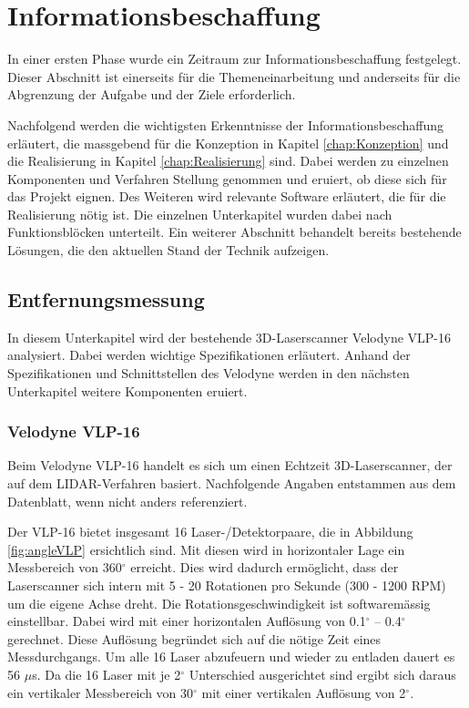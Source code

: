 \chapter{Informationsbeschaffung}
\label{Informationsbeschaffung}
 In einer ersten Phase wurde ein Zeitraum zur Informationsbeschaffung festgelegt. Dieser Abschnitt ist einerseits für die Themeneinarbeitung und anderseits für die Abgrenzung der Aufgabe und der Ziele erforderlich.

Nachfolgend werden die wichtigsten Erkenntnisse der Informationsbeschaffung erläutert, die massgebend für die Konzeption in Kapitel \ref{chap:Konzeption} und die Realisierung in Kapitel \ref{chap:Realisierung} sind. Dabei werden zu einzelnen Komponenten und Verfahren Stellung genommen und eruiert, ob diese sich für das Projekt eignen. Des Weiteren wird relevante Software erläutert, die für die Realisierung nötig ist. Die einzelnen Unterkapitel wurden dabei nach Funktionsblöcken unterteilt. Ein weiterer Abschnitt behandelt bereits bestehende Lösungen, die den aktuellen Stand der Technik aufzeigen. 

\section{Entfernungsmessung}
\label{sec:Entfernungsmessung}
In diesem Unterkapitel wird der bestehende 3D-Laserscanner Velodyne VLP-16 analysiert. Dabei werden wichtige Spezifikationen erläutert. Anhand der Spezifikationen und Schnittstellen des Velodyne werden in den nächsten Unterkapitel weitere Komponenten eruiert.   

\subsection{Velodyne VLP-16}
\label{subsec:Velodyne}
Beim Velodyne VLP-16 handelt es sich um einen Echtzeit 3D-Laserscanner, der auf dem \ac{LIDAR}-Verfahren basiert. Nachfolgende Angaben entstammen aus dem Datenblatt, wenn nicht anders referenziert. \protect\cite{velodyne}

Der VLP-16 bietet insgesamt 16 Laser-/Detektorpaare, die in Abbildung \ref{fig:angleVLP} ersichtlich sind. Mit diesen wird in horizontaler Lage ein Messbereich von 360$^\circ$  erreicht. Dies wird dadurch ermöglicht, dass der Laserscanner sich intern mit 5 - 20 Rotationen pro Sekunde (300 - 1200 RPM) um die eigene Achse dreht. Die Rotationsgeschwindigkeit ist softwaremässig einstellbar. Dabei wird mit einer horizontalen Auflösung von 0.1$^\circ$ – 0.4$^\circ$ gerechnet. Diese Auflösung begründet sich auf die nötige Zeit eines Messdurchgangs. Um alle 16 Laser abzufeuern und wieder zu entladen dauert es 56 $\mu$s.
Da die 16 Laser mit je 2$^\circ$ Unterschied ausgerichtet sind ergibt sich daraus ein vertikaler Messbereich von 30$^\circ$ mit einer vertikalen Auflösung von 2$^\circ$. 

